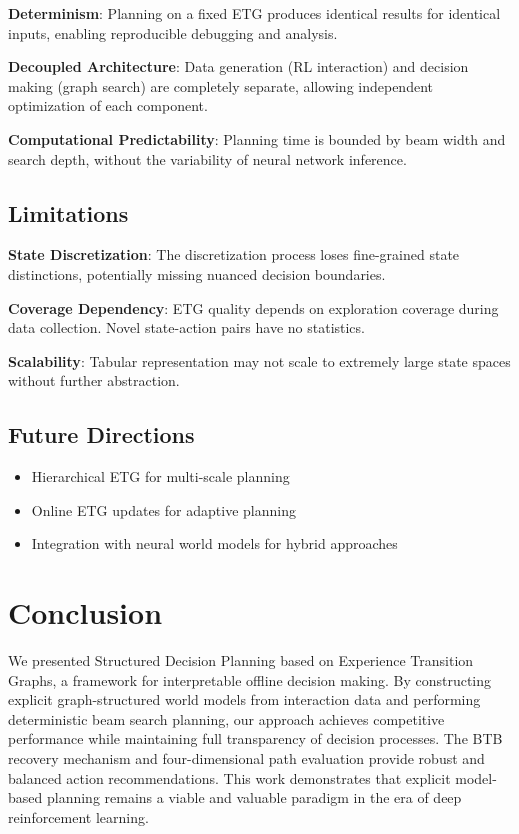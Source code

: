 \documentclass[letterpaper]{article}
\begin{document}
\textbf{Determinism}: Planning on a fixed ETG produces identical results for identical inputs, enabling reproducible debugging and analysis.

\textbf{Decoupled Architecture}: Data generation (RL interaction) and decision making (graph search) are completely separate, allowing independent optimization of each component.

\textbf{Computational Predictability}: Planning time is bounded by beam width and search depth, without the variability of neural network inference.

\subsection{Limitations}

\textbf{State Discretization}: The discretization process loses fine-grained state distinctions, potentially missing nuanced decision boundaries.

\textbf{Coverage Dependency}: ETG quality depends on exploration coverage during data collection. Novel state-action pairs have no statistics.

\textbf{Scalability}: Tabular representation may not scale to extremely large state spaces without further abstraction.

\subsection{Future Directions}

\begin{itemize}
    \item Hierarchical ETG for multi-scale planning
    \item Online ETG updates for adaptive planning
    \item Integration with neural world models for hybrid approaches
\end{itemize}

\section{Conclusion}

We presented Structured Decision Planning based on Experience Transition Graphs, a framework for interpretable offline decision making. By constructing explicit graph-structured world models from interaction data and performing deterministic beam search planning, our approach achieves competitive performance while maintaining full transparency of decision processes. The BTB recovery mechanism and four-dimensional path evaluation provide robust and balanced action recommendations. This work demonstrates that explicit model-based planning remains a viable and valuable paradigm in the era of deep reinforcement learning.
\end{document}
